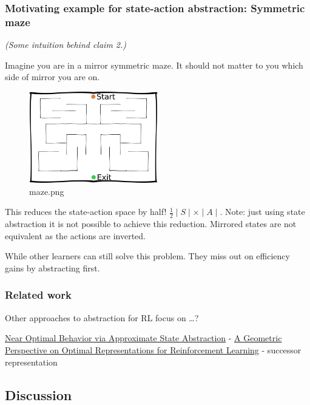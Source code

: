 \hypertarget{motivating-example-for-state-action-abstraction-symmetric-maze}{%
\subsubsection{Motivating example for state-action abstraction:
Symmetric
maze}\label{motivating-example-for-state-action-abstraction-symmetric-maze}}

\emph{(Some intuition behind claim 2.)}

Imagine you are in a mirror symmetric maze. It should not matter to you
which side of mirror you are on.

\begin{figure}
\centering
\includegraphics[width=0.5\textwidth,height=0.5\textheight]{../../pictures/drawings/maze.png}
\caption{maze.png}
\end{figure}

This reduces the state-action space by half!
\(\frac{1}{2}\mid S \mid \times \mid A \mid\). Note: just using state
abstraction it is not possible to achieve this reduction. Mirrored
states are not equivalent as the actions are inverted.

While other learners can still solve this problem. They miss out on
efficiency gains by abstracting first.

\hypertarget{related-work}{%
\subsubsection{Related work}\label{related-work}}

Other approaches to abstraction for RL focus on \ldots{}?

\href{https://arxiv.org/abs/1701.04113}{Near Optimal Behavior via
Approximate State Abstraction} -
\href{https://arxiv.org/abs/1901.11530}{A Geometric Perspective on
Optimal Representations for Reinforcement Learning} - successor
representation

\hypertarget{discussion}{%
\subsection{Discussion}\label{discussion}}

